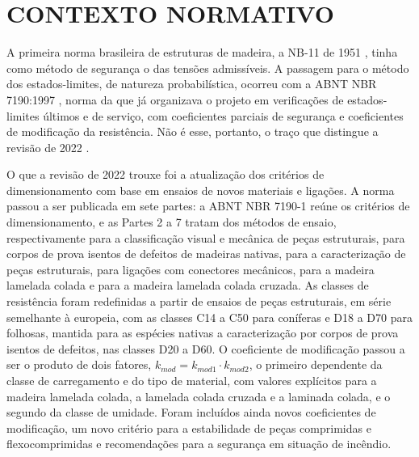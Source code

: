 
\section{CONTEXTO NORMATIVO}\label{sec:contexto-normativo}

A primeira norma brasileira de estruturas de madeira, a NB-11 de 1951
\cite{NB11:1951}, tinha como
método de segurança o das tensões admissíveis. A passagem para o método dos
estados-limites, de natureza probabilística, ocorreu com a ABNT NBR 7190:1997
\cite{NBR7190:1997}, norma da
 que já organizava o projeto em verificações de
estados-limites últimos e de serviço, com coeficientes parciais de segurança e
coeficientes de modificação da resistência. Não é esse, portanto, o traço que
distingue a revisão de 2022 \cite{NBR7190-1:2022}.

O que a revisão de 2022 trouxe foi a atualização dos critérios de dimensionamento
com base em ensaios de novos materiais e ligações. A norma passou a ser publicada
em sete partes: a ABNT NBR 7190-1 reúne os critérios de dimensionamento, e as
Partes 2 a 7 tratam dos métodos de ensaio, respectivamente para a classificação
visual e mecânica de peças estruturais, para corpos de prova isentos de defeitos
de madeiras nativas, para a caracterização de peças estruturais, para ligações
com conectores mecânicos, para a madeira lamelada colada e para a madeira
lamelada colada cruzada. As classes de resistência foram redefinidas a partir
de ensaios de peças estruturais, em série semelhante à europeia, com as classes
C14 a C50 para coníferas e D18 a D70 para folhosas, mantida para as espécies
nativas a caracterização por corpos de prova isentos de defeitos, nas classes
D20 a D60. O coeficiente de modificação passou a ser o produto de dois fatores,
$k_{mod} = k_{mod1} \cdot k_{mod2}$, o primeiro dependente da classe de
carregamento e do tipo de material, com valores explícitos para a madeira
lamelada colada, a lamelada colada cruzada e a laminada colada, e o segundo da
classe de umidade. Foram incluídos ainda novos coeficientes de modificação, um
novo critério para a estabilidade de peças comprimidas e flexocomprimidas e
recomendações para a segurança em situação de incêndio.

